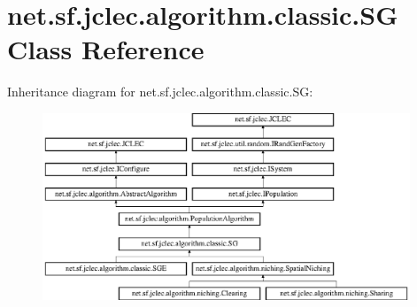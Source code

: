 \hypertarget{classnet_1_1sf_1_1jclec_1_1algorithm_1_1classic_1_1_s_g}{\section{net.\-sf.\-jclec.\-algorithm.\-classic.\-S\-G Class Reference}
\label{classnet_1_1sf_1_1jclec_1_1algorithm_1_1classic_1_1_s_g}
}
Inheritance diagram for net.\-sf.\-jclec.\-algorithm.\-classic.\-S\-G\-:\begin{figure}[H]
\begin{center}
\leavevmode
\includegraphics[height=5.593009cm]{classnet_1_1sf_1_1jclec_1_1algorithm_1_1classic_1_1_s_g}
\end{center}
\end{figure}
